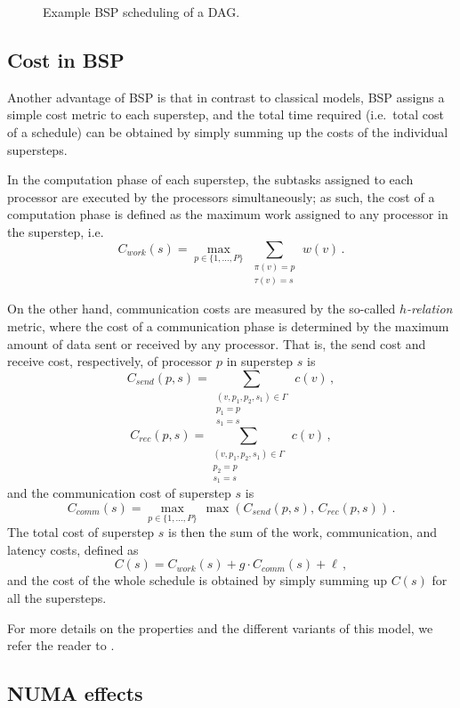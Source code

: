 \documentclass[sigconf,nonacm]{acmart}
\begin{document}
\begin{figure}
    \centering
    \resizebox{0.48\textwidth}{!}{}
    \caption{Example BSP scheduling of a DAG.}
    \label{fig:BSPexample}
\end{figure}

\subsection{Cost in BSP} Another advantage of BSP is that in contrast to classical models, BSP assigns a simple cost metric to each superstep, and the total time required (i.e.\ total cost of a schedule) can be obtained by simply summing up the costs of the individual supersteps.

In the computation phase of each superstep, the subtasks assigned to each processor are executed by the processors simultaneously; as such, the cost of a computation phase is defined as the maximum work assigned to any processor in the superstep, i.e.
\[ C_{work}(s) = \max_{p \in \{1, \ldots, P\}} \, \sum_{\substack{ \pi(v)=p \\ \tau(v)=s }} \, w(v) \, . \]

On the other hand, communication costs are measured by the so-called \emph{$h$-relation} metric, where the cost of a communication phase is determined by the maximum amount of data sent or received by any processor. That is, the send cost and receive cost, respectively, of processor $p$ in superstep $s$ is
\[ C_{send}(p,s) = \sum_{\substack{(v, p_1, p_2, s_1) \in \Gamma \\ p_1=p \\ s_1=s }} \, c(v) \, , \]
\[ C_{rec}(p,s) = \sum_{\substack{(v, p_1, p_2, s_1) \in \Gamma \\ p_2=p \\ s_1=s }} \, c(v) \, , \]
and the communication cost of superstep $s$ is
\[ C_{comm}(s) = \max_{p \in \{1, \ldots, P\}} \, \max \left( C_{send}(p,s), \, C_{rec}(p,s)\right) \, . \]
The total cost of superstep $s$ is then the sum of the work, communication, and latency costs, defined as
\[ C(s) = C_{work}(s) + g \cdot C_{comm}(s) + \ell \, , \]
and the cost of the whole schedule is obtained by simply summing up $C(s)$ for all the supersteps.

For more details on the properties and the different variants of this model, we refer the reader to \cite{DAGBSP}.

\subsection{NUMA effects}
\end{document}
